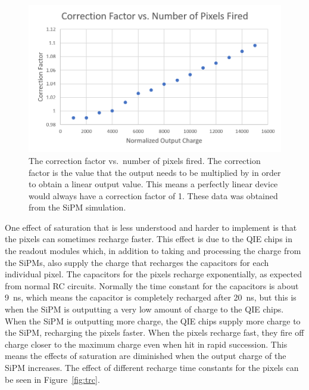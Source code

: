 \begin{figure}
\centering
\includegraphics[width=\linewidth]{Figures/CorFac.png}
\caption{The correction factor vs.\ number of pixels fired. The correction factor is the value that the output needs to be multiplied by in order to obtain a linear output value. This means a perfectly linear device would always have a correction factor of 1. These data was obtained from the SiPM simulation.}
\label{fig:Cor}
\end{figure}

One effect of saturation that is less understood and harder to implement is that the pixels can sometimes recharge faster. This effect is due to the QIE chips in the readout modules which, in addition to taking and processing the charge from the SiPMs, also supply the charge that recharges the capacitors for each individual pixel. The capacitors for the pixels recharge exponentially, as expected from normal RC circuits. Normally the time constant for the capacitors is about 9~ns, which means the capacitor is completely recharged after 20~ns, but this is when the SiPM is outputting a very low amount of charge to the QIE chips. When the SiPM is outputting more charge, the QIE chips supply more charge to the SiPM, recharging the pixels faster. When the pixels recharge fast, they fire off charge closer to the maximum charge even when hit in rapid succession. This means the effects of saturation are diminished when the output charge of the SiPM increases. The effect of different recharge time constants for the pixels can be seen in Figure~\ref{fig:trc}.

